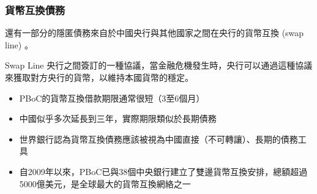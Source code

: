 \begin{frame}
    \frametitle{貨幣互換債務}

    還有一部分的隱匿債務來自於中國央行與其他國家之間在央行的貨幣互換 (swap line) \citep*{Bahaj-Saleem}。
    \begin{block}{Swap Line}
        央行之間簽訂的一種協議，當金融危機發生時，央行可以通過這種協議來獲取對方央行的貨幣，以維持本國貨幣的穩定。
    \end{block}

    \begin{itemize}
        \item PBoC的貨幣互換借款期限通常很短（3至6個月）
        \item 中國似乎多次延長到三年，實際期限類似於長期債務
        \item 世界銀行認為貨幣互換債務應該被視為中國直接（不可轉讓）、長期的債務工具
        \item 自2009年以來，PBoC已與38個中央銀行建立了雙邊貨幣互換安排，總額超過5000億美元，是全球最大的貨幣互換網絡之一
    \end{itemize}

\end{frame}